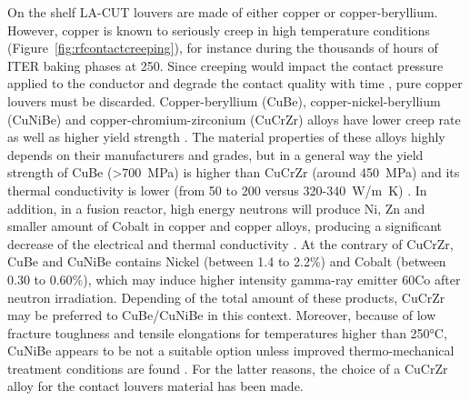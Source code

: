 {On the shelf LA-CUT louvers are made of either copper or copper-beryllium. However, copper is known to seriously creep in high temperature conditions (Figure~\ref{fig:rfcontactcreeping}), for instance during the thousands of hours of ITER baking phases at 250\degC. Since creeping would impact the contact pressure applied to the conductor and degrade the contact quality with time , pure copper louvers must be discarded. Copper-beryllium (CuBe), copper-nickel-beryllium (CuNiBe) and copper-chromium-zirconium (CuCrZr) alloys have lower creep rate as well as higher yield strength . The material properties of these alloys highly depends on their manufacturers and grades, but in a general way the yield strength of CuBe (>700~MPa) is higher than CuCrZr (around 450~MPa) and its thermal conductivity is lower (from 50 to 200 versus 320-340~\si{W/m.K}) \cite{li2012}. In addition, in a fusion reactor, high energy neutrons will produce Ni, Zn and smaller amount of Cobalt in copper and copper alloys, producing a significant decrease of the electrical and thermal conductivity  . At the contrary of CuCrZr, CuBe and CuNiBe contains Nickel (between 1.4 to 2.2\%) and Cobalt (between 0.30 to 0.60\%), which may induce higher intensity gamma-ray emitter 60Co after neutron irradiation. Depending of the total amount of these products, CuCrZr may be preferred to CuBe/CuNiBe in this context. Moreover, because of low fracture toughness and tensile elongations for temperatures higher than 250$\si{\degreeCelsius}$, CuNiBe appears to be not a suitable option unless improved thermo-mechanical treatment conditions are found . For the latter reasons, the choice of a CuCrZr alloy for the contact louvers material has been made.

}
